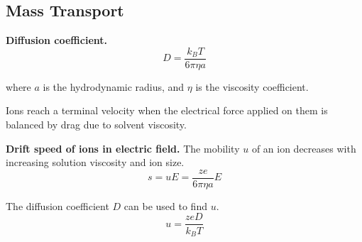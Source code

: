\subsection*{Mass Transport} %

\textbf{Diffusion coefficient.} $$D = \frac{k_B T}{6 \pi \eta a}$$

where $a$ is the hydrodynamic radius, and $\eta$ is the viscosity coefficient.

Ions reach a terminal velocity when the electrical force applied on them is balanced
by drag due to solvent viscosity.
\vspace{\baselineskip}

\textbf{Drift speed of ions in electric field.} The mobility $u$ of an ion decreases with increasing solution viscosity and ion size. $$s = uE = \frac{ze}{6 \pi \eta a} E$$

The diffusion coefficient $D$ can be used to find $u$.
\begin{equation*}
    u = \frac{zeD}{k_B T}
\end{equation*}

 